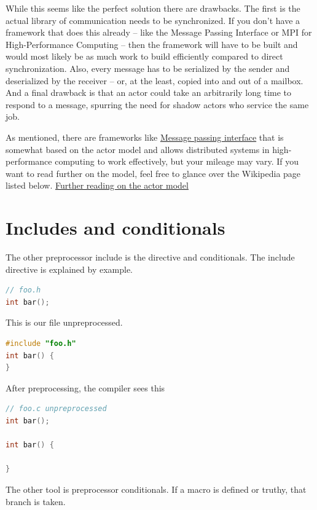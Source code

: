 While this seems like the perfect solution there are drawbacks.
The first is the actual library of communication needs to be synchronized.
If you don't have a framework that does this already -- like the Message Passing Interface or MPI for High-Performance Computing -- then the framework will have to be built and would most likely be as much work to build efficiently compared to direct synchronization.
Also, every message has to be serialized by the sender and deserialized by the receiver -- or, at the least, copied into and out of a mailbox.
And a final drawback is that an actor could take an arbitrarily long time to respond to a message, spurring the need for shadow actors who service the same job.

As mentioned, there are frameworks like \href{https://en.wikipedia.org/wiki/Message\_Passing\_Interface}{Message passing interface} that is somewhat based on the actor model and allows distributed systems in high-performance computing to work effectively, but your mileage may vary.
If you want to read further on the model, feel free to glance over the Wikipedia page listed below.
\href{https://en.wikipedia.org/wiki/Actor\_model}{Further reading on the actor model}


\section{Includes and conditionals}

The other preprocessor include is the  directive and conditionals.
The include directive is explained by example.

\begin{lstlisting}[language=C]
// foo.h
int bar();
\end{lstlisting}

This is our file  unpreprocessed.

\begin{lstlisting}[language=C]
#include "foo.h"
int bar() {
}
\end{lstlisting}

After preprocessing, the compiler sees this

\begin{lstlisting}[language=C]
// foo.c unpreprocessed
int bar();

int bar() {

}
\end{lstlisting}

The other tool is preprocessor conditionals.
If a macro is defined or truthy, that branch is taken.

